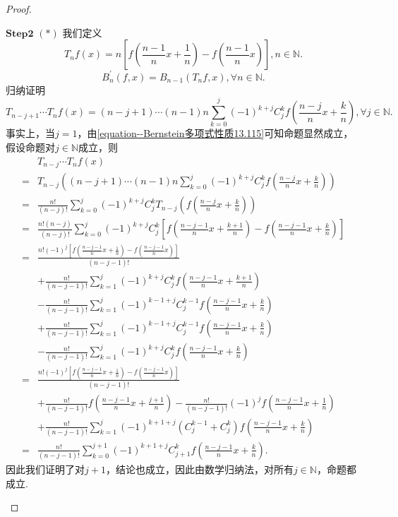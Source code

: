 \documentclass[../../main.tex]{subfiles}
\begin{document}
\begin{proof}
\begin{enumerate}[(1)]
$\mathbf{Step}\mathbf{2}$ \((*)\) 我们定义
\[
T_nf(x)=n\left[f\left(\frac{n - 1}{n}x+\frac{1}{n}\right)-f\left(\frac{n - 1}{n}x\right)\right],n\in\mathbb{N}.
\]
\[
B_n^\prime(f,x)=B_{n - 1}(T_nf,x),\forall n\in\mathbb{N}.
\]
归纳证明
\[
T_{n - j + 1}\cdots T_nf(x)=(n - j + 1)\cdots(n - 1)n\sum_{k = 0}^j(-1)^{k + j}C_j^kf\left(\frac{n - j}{n}x+\frac{k}{n}\right),\forall j\in\mathbb{N}.
\]
事实上，当\(j = 1\)，由\eqref{equation--Bernstein多项式性质13.115}可知命题显然成立，假设命题对\(j\in\mathbb{N}\)成立，则
\begin{align*}
&T_{n - j}\cdots T_nf(x)\\
=&T_{n - j}\left((n - j + 1)\cdots(n - 1)n\sum_{k = 0}^j(-1)^{k + j}C_j^kf\left(\frac{n - j}{n}x+\frac{k}{n}\right)\right)\\
=&\frac{n!}{(n - j)!}\sum_{k = 0}^j(-1)^{k + j}C_j^kT_{n - j}\left(f\left(\frac{n - j}{n}x+\frac{k}{n}\right)\right)\\
=&\frac{n!(n - j)}{(n - j)!}\sum_{k = 0}^j(-1)^{k + j}C_j^k\left[f\left(\frac{n - j - 1}{n}x+\frac{k + 1}{n}\right)-f\left(\frac{n - j - 1}{n}x+\frac{k}{n}\right)\right]\\
=&\frac{n!(-1)^j\left[f\left(\frac{n - j - 1}{n}x+\frac{1}{n}\right)-f\left(\frac{n - j - 1}{n}x\right)\right]}{(n - j - 1)!}\\
&+\frac{n!}{(n - j - 1)!}\sum_{k = 1}^j(-1)^{k + j}C_j^kf\left(\frac{n - j - 1}{n}x+\frac{k + 1}{n}\right)\\
&-\frac{n!}{(n - j - 1)!}\sum_{k = 1}^j(-1)^{k - 1 + j}C_j^{k - 1}f\left(\frac{n - j - 1}{n}x+\frac{k}{n}\right)\\
&+\frac{n!}{(n - j - 1)!}\sum_{k = 1}^j(-1)^{k - 1 + j}C_j^{k - 1}f\left(\frac{n - j - 1}{n}x+\frac{k}{n}\right)\\
&-\frac{n!}{(n - j - 1)!}\sum_{k = 1}^j(-1)^{k + j}C_j^kf\left(\frac{n - j - 1}{n}x+\frac{k}{n}\right)\\
=&\frac{n!(-1)^j\left[f\left(\frac{n - j - 1}{n}x+\frac{1}{n}\right)-f\left(\frac{n - j - 1}{n}x\right)\right]}{(n - j - 1)!}\\
&+\frac{n!}{(n - j - 1)!}f\left(\frac{n - j - 1}{n}x+\frac{j + 1}{n}\right)-\frac{n!}{(n - j - 1)!}(-1)^jf\left(\frac{n - j - 1}{n}x+\frac{1}{n}\right)\\
&+\frac{n!}{(n - j - 1)!}\sum_{k = 1}^{j}(-1)^{k + 1 + j}(C_j^{k - 1}+C_j^k)f\left(\frac{n - j - 1}{n}x+\frac{k}{n}\right)\\
=&\frac{n!}{(n - j - 1)!}\sum_{k = 0}^{j + 1}(-1)^{k + 1 + j}C_{j + 1}^kf\left(\frac{n - j - 1}{n}x+\frac{k}{n}\right).
\end{align*}
因此我们证明了对\(j + 1\)，结论也成立，因此由数学归纳法，对所有\(j\in\mathbb{N}\)，命题都成立.


\end{enumerate}
\end{proof}
\end{document}
